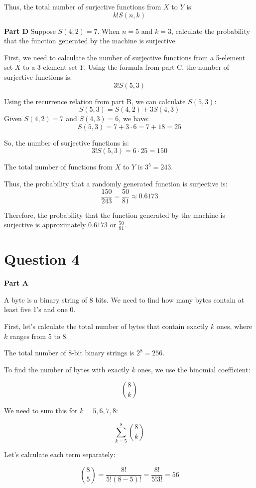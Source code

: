 \documentclass{article}
\begin{document}
	Thus, the total number of surjective functions from \( X \) to \( Y \) is:
	\[ k! S(n, k) \]
	
	\textbf{Part D}
	Suppose \( S(4,2) = 7 \). When \( n = 5 \) and \( k = 3 \), calculate the probability that the function generated by the machine is surjective.
	
	First, we need to calculate the number of surjective functions from a 5-element set \( X \) to a 3-element set \( Y \). Using the formula from part C, the number of surjective functions is:
	\[ 3! S(5, 3) \]
	
	Using the recurrence relation from part B, we can calculate \( S(5, 3) \):
	\[ S(5, 3) = S(4, 2) + 3S(4, 3) \]
	Given \( S(4, 2) = 7 \) and \( S(4, 3) = 6 \), we have:
	\[ S(5, 3) = 7 + 3 \cdot 6 = 7 + 18 = 25 \]
	
	So, the number of surjective functions is:
	\[ 3! S(5, 3) = 6 \cdot 25 = 150 \]
	
	The total number of functions from \( X \) to \( Y \) is \( 3^5 = 243 \).
	
	Thus, the probability that a randomly generated function is surjective is:
	\[ \frac{150}{243} = \frac{50}{81} \approx 0.6173 \]
	
	Therefore, the probability that the function generated by the machine is surjective is approximately \( 0.6173 \) or \( \frac{50}{81} \).
	
	
	
	\section{Question 4}
	\textbf{Part A}
	
	A byte is a binary string of 8 bits. We need to find how many bytes contain at least five 1's and one 0.
	
	First, let's calculate the total number of bytes that contain exactly \( k \) ones, where \( k \) ranges from 5 to 8.
	
	The total number of 8-bit binary strings is \( 2^8 = 256 \).
	
	To find the number of bytes with exactly \( k \) ones, we use the binomial coefficient:
	
	\[
	\binom{8}{k}
	\]
	
	We need to sum this for \( k = 5, 6, 7, 8 \):
	
	\[
	\sum_{k=5}^{8} \binom{8}{k}
	\]
	
	Let's calculate each term separately:
	
	\[
	\binom{8}{5} = \frac{8!}{5!(8-5)!} = \frac{8!}{5!3!} = 56
	\]
	
\end{document}
